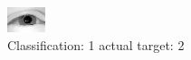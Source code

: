 \begin{figure}[h!]
\begin{center}
\includegraphics[width=0.60\columnwidth]{figures/ID2349_class_1_target_2.png}
\end{center}
\caption{ Classification: 1 actual target: 2}
\label{fig:ID2349_class_1_target_2}
\end{figure}
